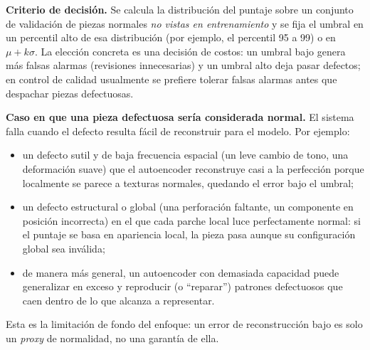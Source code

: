 \documentclass[12pt, a4paper]{article}
\begin{document}
\textbf{Criterio de decisión.} Se calcula la distribución del puntaje sobre un conjunto de
validación de piezas normales \emph{no vistas en entrenamiento} y se fija el umbral en un
percentil alto de esa distribución (por ejemplo, el percentil 95 a 99) o en
$\mu + k\sigma$. La elección concreta es una decisión de costos: un umbral bajo genera más
falsas alarmas (revisiones innecesarias) y un umbral alto deja pasar defectos; en control de
calidad usualmente se prefiere tolerar falsas alarmas antes que despachar piezas
defectuosas.

\textbf{Caso en que una pieza defectuosa sería considerada normal.} El sistema falla cuando
el defecto resulta fácil de reconstruir para el modelo. Por ejemplo:
\begin{itemize}[leftmargin=2em]
  \item un defecto sutil y de baja frecuencia espacial (un leve cambio de tono, una
        deformación suave) que el autoencoder reconstruye casi a la perfección porque
        localmente se parece a texturas normales, quedando el error bajo el umbral;
  \item un defecto estructural o global (una perforación faltante, un componente en posición
        incorrecta) en el que cada parche local luce perfectamente normal: si el puntaje se
        basa en apariencia local, la pieza pasa aunque su configuración global sea inválida;
  \item de manera más general, un autoencoder con demasiada capacidad puede generalizar en
        exceso y reproducir (o ``reparar'') patrones defectuosos que caen dentro de lo que
        alcanza a representar.
\end{itemize}
Esta es la limitación de fondo del enfoque: un error de reconstrucción bajo es solo un
\emph{proxy} de normalidad, no una garantía de ella.
\end{document}
